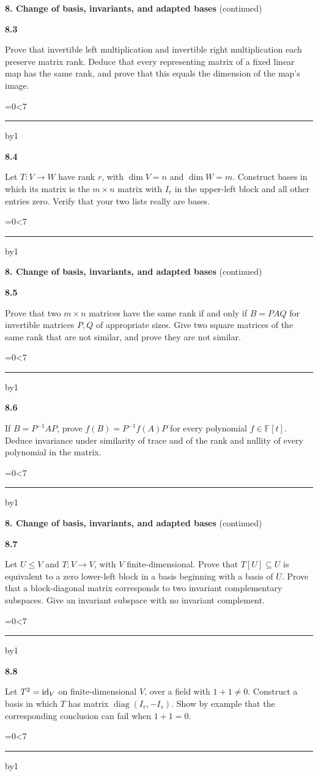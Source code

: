 \documentclass[11pt,letterpaper]{article}
\newcommand{\topicshort}{Problem collection}
\newcommand{\F}{\mathbb F}\newcommand{\R}{\mathbb R}\newcommand{\Q}{\mathbb Q}\newcommand{\C}{\mathbb C}\newcommand{\Z}{\mathbb Z}
\newcommand{\ruled}[1]{\par\begingroup\parskip=0pt\baselineskip=17pt\count255=0\loop\ifnum\count255<#1\noindent\textcolor{black!17}{\rule{\linewidth}{.25pt}}\par\advance\count255 by1\repeat\endgroup}
\newcommand{\problem}[4]{\noindent\begin{minipage}[t][3.48in][t]{\linewidth}\textbf{\color{navy}#1}\quad{\small\sffamily\color{teal}#2#3}\par #4\par\vfill\ruled{7}\end{minipage}}
\begin{document}
{\large\bfseries\color{navy}8. Change of basis, invariants, and adapted bases} {\small(continued)}\par\vspace{9pt}
\problem{8.3}{M}{ / $\star$}{Prove that invertible left multiplication and invertible right multiplication each preserve matrix rank. Deduce that every representing matrix of a fixed linear map has the same rank, and prove that this equals the dimension of the map's image.}
\par\vspace{14pt}
\problem{8.4}{M}{ / $\star$}{Let $T:V\to W$ have rank $r$, with $\dim V=n$ and $\dim W=m$. Construct bases in which its matrix is the $m\times n$ matrix with $I_r$ in the upper-left block and all other entries zero. Verify that your two lists really are bases.}
\newpage
\renewcommand{\topicshort}{Change of basis}
{\large\bfseries\color{navy}8. Change of basis, invariants, and adapted bases} {\small(continued)}\par\vspace{9pt}
\problem{8.5}{M}{}{Prove that two $m\times n$ matrices have the same rank if and only if $B=PAQ$ for invertible matrices $P,Q$ of appropriate sizes. Give two square matrices of the same rank that are not similar, and prove they are not similar.}
\par\vspace{14pt}
\problem{8.6}{M}{}{If $B=P^{-1}AP$, prove $f(B)=P^{-1}f(A)P$ for every polynomial $f\in\F[t]$. Deduce invariance under similarity of trace and of the rank and nullity of every polynomial in the matrix.}
\newpage
\renewcommand{\topicshort}{Change of basis}
{\large\bfseries\color{navy}8. Change of basis, invariants, and adapted bases} {\small(continued)}\par\vspace{9pt}
\problem{8.7}{M}{}{Let $U\le V$ and $T:V\to V$, with $V$ finite-dimensional. Prove that $T[U]\subseteq U$ is equivalent to a zero lower-left block in a basis beginning with a basis of $U$. Prove that a block-diagonal matrix corresponds to two invariant complementary subspaces. Give an invariant subspace with no invariant complement.}
\par\vspace{14pt}
\problem{8.8}{M}{}{Let $T^2=\operatorname{id}_V$ on finite-dimensional $V$, over a field with $1+1\ne0$. Construct a basis in which $T$ has matrix $\operatorname{diag}(I_r,-I_s)$. Show by example that the corresponding conclusion can fail when $1+1=0$.}
\newpage
\renewcommand{\topicshort}{Change of basis}
\end{document}
